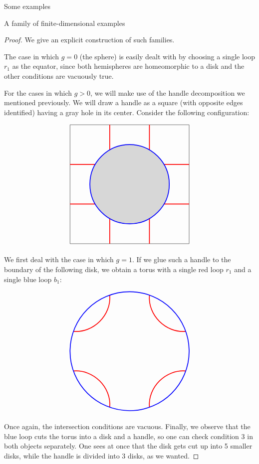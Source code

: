 \begin{chapter}{Some examples}
\begin{section}{A family of finite-dimensional examples}
\begin{proof} We give an explicit construction of such families.

The case in which $g=0$ (the sphere) is easily dealt with by choosing a single loop $r_1$ as the equator, since both hemispheres are homeomorphic to a disk and the other conditions are vacuously true.

For the cases in which $g>0$, we will make use of the handle decomposition we mentioned previously. We will draw a handle as a square (with opposite edges identified) having a gray hole in its center. Consider the following configuration:

\begin{figure}[h]
\[
\begin{tikzpicture}
\draw (0,0) node[minimum size=6cm,draw] {};

\fill [black,opacity=.15] circle (2cm);

\draw[red, very thick] (-3,1) -- (-1.73,1);
\draw[red, very thick] (-3,-1) -- (-1.73,-1);

\draw[red, very thick] (3,1) -- (1.73,1);
\draw[red, very thick] (3,-1) -- (1.73,-1);

\draw[red, very thick] (1,-3) -- (1,-1.73);
\draw[red, very thick] (-1,-3) -- (-1,-1.73);

\draw[red, very thick] (1,3) -- (1,1.73);
\draw[red, very thick] (-1,3) -- (-1,1.73);

\draw[blue, very thick] (0,0) circle (2cm);
\end{tikzpicture}
\]
\end{figure}

We first deal with the case in which $g=1$. If we glue such a handle to the boundary of the following disk, we obtain a torus with a single red loop $r_1$ and a single blue loop $b_1$:

\begin{figure}[h]
\label{divided-handle}
\[
\begin{tikzpicture}

\draw[red, very thick] (-2.83,1) to [bend right=50] (-1,2.83);
\draw[red, very thick] (2.83,1) to [bend left=50] (1,2.83);
\draw[red, very thick] (2.83,-1) to [bend right=50] (1,-2.83);
\draw[red, very thick] (-2.83,-1) to [bend left=50] (-1,-2.83);

\draw[blue, very thick] (0,0) circle (3cm);
\end{tikzpicture}
\]
\end{figure}

Once again, the intersection conditions are vacuous. Finally, we observe that the blue loop cuts the torus into a disk and a handle, so one can check condition $3$ in both objects separately. One sees at once that the disk gets cut up into 5 smaller disks, while the handle is divided into $3$ disks, as we wanted.


\end{proof}
\end{section}
\end{chapter}
